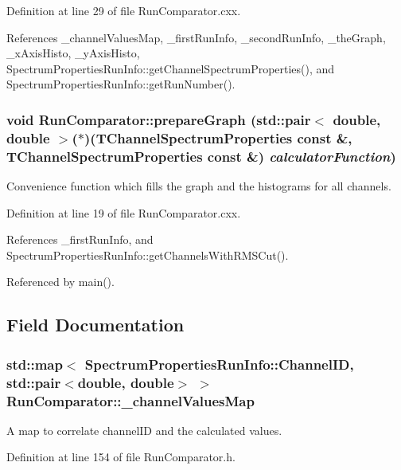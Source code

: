 Definition at line 29 of file RunComparator.cxx.

References \_\-channelValuesMap, \_\-firstRunInfo, \_\-secondRunInfo, \_\-theGraph, \_\-xAxisHisto, \_\-yAxisHisto, SpectrumPropertiesRunInfo::getChannelSpectrumProperties(), and SpectrumPropertiesRunInfo::getRunNumber().\hypertarget{class_run_comparator_a31b28d33c185a2be5a17c42525dd2ec0}{
\subsubsection[{prepareGraph}]{\setlength{\rightskip}{0pt plus 5cm}void RunComparator::prepareGraph (std::pair$<$ double, double $>$($\ast$)({\bf TChannelSpectrumProperties} const \&, {\bf TChannelSpectrumProperties} const \&) {\em calculatorFunction})}}
\label{class_run_comparator_a31b28d33c185a2be5a17c42525dd2ec0}


Convenience function which fills the graph and the histograms for all channels. 

Definition at line 19 of file RunComparator.cxx.

References \_\-firstRunInfo, and SpectrumPropertiesRunInfo::getChannelsWithRMSCut().

Referenced by main().

\subsection{Field Documentation}
\hypertarget{class_run_comparator_aae7b9f0694da7b251fdc513c5cf466b7}{
\subsubsection[{\_\-channelValuesMap}]{\setlength{\rightskip}{0pt plus 5cm}std::map$<$ {\bf SpectrumPropertiesRunInfo::ChannelID}, std::pair$<$double, double$>$ $>$ {\bf RunComparator::\_\-channelValuesMap}}}
\label{class_run_comparator_aae7b9f0694da7b251fdc513c5cf466b7}


A map to correlate channelID and the calculated values. 

Definition at line 154 of file RunComparator.h.

